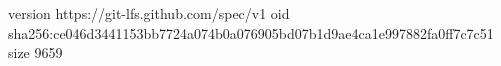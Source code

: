 version https://git-lfs.github.com/spec/v1
oid sha256:ce046d3441153bb7724a074b0a076905bd07b1d9ae4ca1e997882fa0ff7c7c51
size 9659
